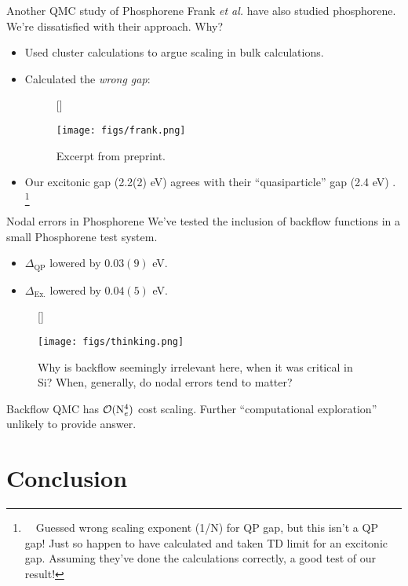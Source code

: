 \documentclass[12pt, pdf, hyperref={draft}, usenames, dvipsnames]{beamer}
\newcommand{\red}[1]{{\bf\color{LancsRed}{#1}}}
\begin{document}
\begin{frame}{Another QMC study of Phosphorene}
Frank \textit{et al.} have also studied phosphorene. We're
dissatisfied with their approach. Why?
\begin{itemize}
  \item Used cluster calculations to argue scaling in bulk calculations.
  \item Calculated the \textit{wrong gap}:
\begin{figure}[H]
  [\FBwidth]
  {\caption{Excerpt from preprint.}\label{fig:frank}}
  {\texttt{[image: figs/frank.png]}}
\end{figure}
  \item Our excitonic gap (2.2(2) eV) agrees with their ``quasiparticle'' gap
  (2.4 eV) \smiley{}. \footnote{~~Guessed wrong scaling exponent (1/N) for QP gap, but
  this isn't a QP gap! Just so happen to have calculated and taken TD limit for
  an excitonic gap.  Assuming they've done the calculations correctly, a good
  test of our result!}
\end{itemize}
\end{frame}

\begin{frame}{Nodal errors in Phosphorene}
We've tested the inclusion of backflow functions in a small Phosphorene test
system.
\begin{itemize}
  \item $\Delta_{\text{QP}} $ lowered by $ 0.03(9)$ eV.
  \item $\Delta_{\text{Ex.}} $ lowered by $ 0.04(5)$ eV.
\end{itemize}
\begin{figure}[H]
  [\FBwidth]
  {\caption*{\red{Q} Why is backflow seemingly irrelevant here, when it
  was critical in Si? When, generally, do nodal errors tend to matter?}\label{fig:puzzled}}
  {\texttt{[image: figs/thinking.png]}}
\end{figure}
Backflow QMC has $\mathcal{O}({\rm N}^4_e)$ cost scaling. Further
``computational exploration'' unlikely to provide answer.
\end{frame}

\section{Conclusion}
\end{document}
